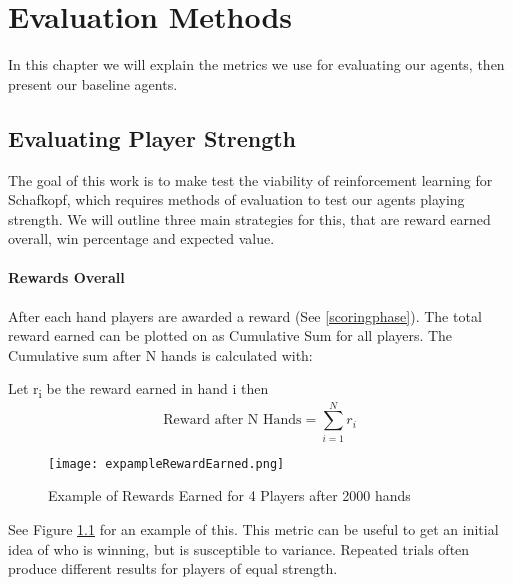 \chapter{Evaluation Methods}
In this chapter we will explain the metrics we use for evaluating our agents, then present our baseline agents.


\section{Evaluating Player Strength}
The goal of this work is to make test the viability of reinforcement learning for Schafkopf, which requires methods
of evaluation to test our agents playing strength.
We will outline three main strategies for this, that are reward earned overall, win percentage and expected value.

\subsubsection{Rewards Overall}
After each hand players are awarded a reward (See \ref{scoringphase}).
The total reward earned can be plotted on as Cumulative Sum for all players.
The Cumulative sum after N hands is calculated with:
\newline
\begin{center}
    Let r\textsubscript{i} be the reward earned in hand i then
    \begin{equation}
        \text{Reward after N Hands} = \sum_{i=1}^{N} r_{i}
\end{equation}
\newline
\begin{figure}[h]
    \centering
    \texttt{[image: expampleRewardEarned.png]}
    \caption{Example of Rewards Earned for 4 Players after 2000 hands}
    \label{fig:exampleCumSum}
\end{figure}
\end{center}
See Figure \ref{fig:exampleCumSum} for an example of this.\newline
This metric can be useful to get an initial idea of who is winning, but is susceptible to variance.\newline
Repeated trials often produce different results for players of equal strength.

